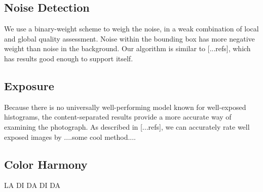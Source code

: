 \documentclass[twocolumn]{article}
\begin{document}
\subsection{Noise Detection}
We use a binary-weight scheme to weigh the noise, in a weak combination of local and global quality assessment. Noise within the bounding box has more negative weight than noise in the background. Our algorithm is similar to [...refs], which has results good enough to support itself.
\subsection{Exposure}
Because there is no universally well-performing  model known for well-exposed histograms, the content-separated results provide a more accurate way of examining the photograph. As described in [...refs], we can accurately rate well exposed images by ....some cool method....

\subsection{Color Harmony}
LA DI DA DI DA
\end{document}
